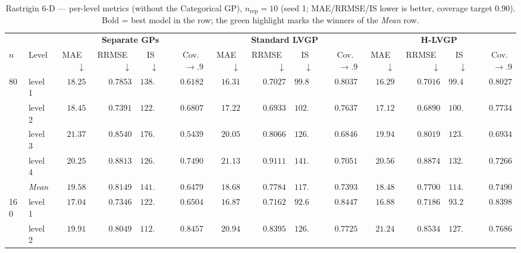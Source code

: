 \begin{table}[htbp]
\centering
\scriptsize
\setlength{\tabcolsep}{2.5pt}
\setlength{\fboxsep}{1pt}
\caption{Rastrigin 6-D --- per-level metrics (without the Categorical GP), $n_{\mathrm{rep}}=10$ (seed 1; MAE/RRMSE/IS lower is better, coverage target $0.90$). Bold = best model in the row; the green highlight marks the winners of the \emph{Mean} row.}
\label{tab:rastrigin_6d_nrep10_nocat}
\begin{tabular}{llrrrrrrrrrrrr}
\toprule
 & & \multicolumn{4}{c}{\textbf{Separate GPs}} & \multicolumn{4}{c}{\textbf{Standard LVGP}} & \multicolumn{4}{c}{\textbf{H-LVGP}} \\
\cmidrule(lr){3-6} \cmidrule(lr){7-10} \cmidrule(lr){11-14}
$n$ & Level & MAE~$\downarrow$ & RRMSE~$\downarrow$ & IS~$\downarrow$ & Cov.~$\to.9$ & MAE~$\downarrow$ & RRMSE~$\downarrow$ & IS~$\downarrow$ & Cov.~$\to.9$ & MAE~$\downarrow$ & RRMSE~$\downarrow$ & IS~$\downarrow$ & Cov.~$\to.9$ \\
\midrule
\multirow{5}{*}{80} & level 1 & $18.25$ & $0.7853$ & $138.1$ & $0.6182$ & $16.31$ & $0.7027$ & $99.87$ & {\boldmath$0.8037$} & {\boldmath$16.29$} & {\boldmath$0.7016$} & {\boldmath$99.46$} & $0.8027$ \\
 & level 2 & $18.45$ & $0.7391$ & $122.9$ & $0.6807$ & $17.22$ & $0.6933$ & $102.3$ & $0.7637$ & {\boldmath$17.12$} & {\boldmath$0.6890$} & {\boldmath$100.4$} & {\boldmath$0.7734$} \\
 & level 3 & $21.37$ & $0.8540$ & $176.9$ & $0.5439$ & $20.05$ & $0.8066$ & $126.2$ & $0.6846$ & {\boldmath$19.94$} & {\boldmath$0.8019$} & {\boldmath$123.7$} & {\boldmath$0.6934$} \\
 & level 4 & {\boldmath$20.25$} & {\boldmath$0.8813$} & {\boldmath$126.5$} & {\boldmath$0.7490$} & $21.13$ & $0.9111$ & $141.5$ & $0.7051$ & $20.56$ & $0.8874$ & $132.9$ & $0.7266$ \\
 & \textit{Mean} & $19.58$ & $0.8149$ & $141.1$ & $0.6479$ & $18.68$ & $0.7784$ & $117.5$ & $0.7393$ & \colorbox{green!20}{\boldmath$18.48$} & \colorbox{green!20}{\boldmath$0.7700$} & \colorbox{green!20}{\boldmath$114.1$} & \colorbox{green!20}{\boldmath$0.7490$} \\
\midrule
\multirow{5}{*}{160} & level 1 & $17.04$ & $0.7346$ & $122.5$ & $0.6504$ & {\boldmath$16.87$} & {\boldmath$0.7162$} & {\boldmath$92.62$} & {\boldmath$0.8447$} & $16.88$ & $0.7186$ & $93.23$ & $0.8398$ \\
 & level 2 & {\boldmath$19.91$} & {\boldmath$0.8049$} & {\boldmath$112.1$} & {\boldmath$0.8457$} & $20.94$ & $0.8395$ & $126.8$ & $0.7725$ & $21.24$ & $0.8534$ & $127.8$ & $0.7686$ \\

\end{tabular}
\end{table}
